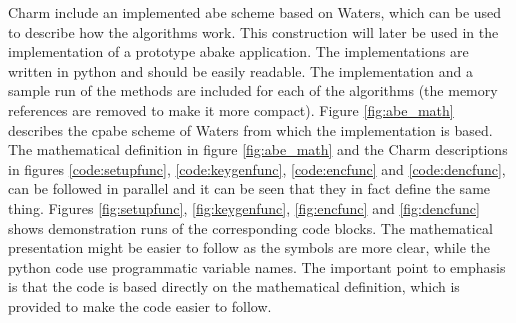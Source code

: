 Charm include an implemented \gls{abe} scheme based on Waters\cite{abe_waters09}, which can be used to describe how the algorithms work. This construction will later be used in the implementation of a prototype \gls{abake} application. The implementations are written in python and should be easily readable. The implementation and a sample run of the methods are included for each of the algorithms (the memory references are removed to make it more compact). Figure \ref{fig:abe_math} describes the \gls{cpabe} scheme of Waters\cite{abe_waters09} from which the implementation is based. The mathematical definition in figure \ref{fig:abe_math} and the Charm descriptions in figures \ref{code:setupfunc}, \ref{code:keygenfunc}, \ref{code:encfunc} and \ref{code:dencfunc},  can be followed in parallel and it can be seen that they in fact define the same thing. Figures \ref{fig:setupfunc}, \ref{fig:keygenfunc}, \ref{fig:encfunc} and \ref{fig:dencfunc} shows demonstration runs of the corresponding code blocks. The mathematical presentation might be easier to follow as the symbols are more clear, while the python code use programmatic variable names. The important point to emphasis is that the code is based directly on the mathematical definition, which is provided to make the code easier to follow.

\clearpage

